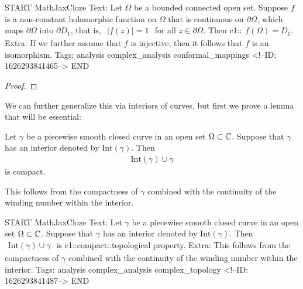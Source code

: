 \documentclass{memoir}
\begin{document}
\begin{anki}
START
MathJaxCloze
Text: Let \(\Omega \) be a bounded connected open set. Suppose \(f\) is a non-constant holomorphic function on \(\Omega \) that is continuous on \(\partial\Omega \), which maps \(\partial\Omega \) into \(\partial D_1\), that is,
\(\begin{align*}
  	\left| f(z) \right| =1
  \end{align*}\)
for all \(z \in \partial\Omega \). Then
 {{c1::\(\begin{align*}
        	f(\Omega ) = D_1.
        \end{align*}\)}}
Extra: If we further assume that \(f\) is injective, then it follows that \(f\) is an isomorphism.
Tags: analysis complex_analysis conformal_mappings
<!--ID: 1626293841465-->
END
\end{anki}


\begin{proof}%
	
\end{proof}

We can further generalize this via interiors of curves, but first we prove a lemma that will be essential:

\begin{lemma}
	Let \(\gamma \) be a piecewise smooth closed curve in an open set \(\Omega \subset \mathbb{C}\). Suppose that \(\gamma \) has an interior denoted by \(\textrm{Int}(\gamma )\). Then
	\begin{align*}
		\textrm{Int}(\gamma ) \cup \gamma 
	\end{align*}
	is compact.
\end{lemma}
This follows from the compactness of \(\gamma \) combined with the continuity of the winding number within the interior.

\begin{anki}
START
MathJaxCloze
Text: Let \(\gamma \) be a piecewise smooth closed curve in an open set \(\Omega \subset \mathbb{C}\). Suppose that \(\gamma \) has an interior denoted by \(\textrm{Int}(\gamma )\). Then
\(\begin{align*}
  	\textrm{Int}(\gamma ) \cup \gamma 
  \end{align*}\)
is {{c1::compact::topological property}}.
Extra: This follows from the compactness of \(\gamma \) combined with the continuity of the winding number within the interior.
Tags: analysis complex_analysis complex_topology
<!--ID: 1626293841487-->
END
\end{anki}
\end{document}
